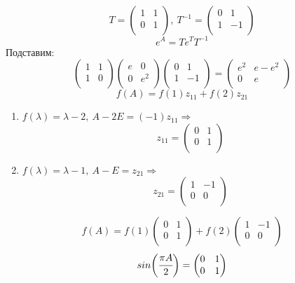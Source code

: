 \documentclass[12pt]{article}
\theoremstyle{definition}
\numberwithin{equation}{section}
\begin{document}
\[T = \begin{pmatrix}
1 & 1\\
0 & 1\\
\end{pmatrix},~T^{-1}= \begin{pmatrix}
0 & 1\\
1 & -1\\
\end{pmatrix}\]
$$e^A=Te^T T^{-1}$$
Подставим:
\[\begin{pmatrix}
1 & 1\\
1 & 0\\
\end{pmatrix}\begin{pmatrix}
e & 0\\
0 & e^2\\
\end{pmatrix}\begin{pmatrix}
0 & 1\\
1 & -1\\
\end{pmatrix} = \begin{pmatrix}
e^2 & e-e^2\\
0 & e\\
\end{pmatrix}\]
$$f(A)=f(1)z_{11}+f(2)z_{21}$$
\begin{enumerate}
    \item $f(\lambda)=\lambda-2,~A-2E=(-1)z_{11} \Rightarrow$ \[z_{11}=\begin{pmatrix}
0 & 1\\
0 & 1\\
\end{pmatrix}\]
\item $f(\lambda)=\lambda-1,~A-E=z_{21} \Rightarrow$ 
\[z_{21}=\begin{pmatrix}
1 & -1\\
0 & 0\\
\end{pmatrix}\]
\end{enumerate}
\[f(A)=f(1)\begin{pmatrix}
0 & 1\\
0 & 1\\
\end{pmatrix}+f(2)\begin{pmatrix}
1 & -1\\
0 & 0\\
\end{pmatrix}\]
\[sin\bigg(\cfrac{\pi A}{2}\bigg) = \begin{pmatrix}
0 & 1\\
0 & 1\\
\end{pmatrix}\]
\end{document}
